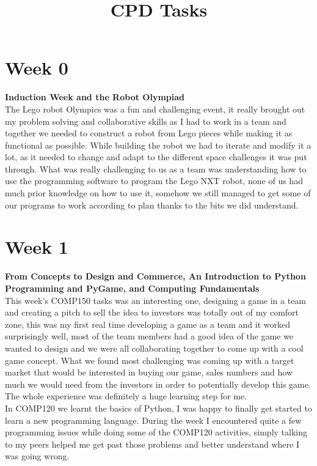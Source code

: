 \documentclass[11pt]{article}
\begin{document}
\title{CPD Tasks}
{\section*{Week 0}
{\small\textbf{Induction Week and the Robot Olympiad}}\\
The Lego robot Olympics was a fun and challenging event, it really brought out my problem solving and collaborative skills as I had to work in a team and together we needed to  construct a robot from Lego pieces while making it as functional as possible. While building the robot we had to iterate and modify it a lot, as it needed to change and adapt to the different space challenges it was put through. What was really challenging to us as a team was understanding how to use the programming software to program the Lego NXT robot, none of us had much prior knowledge on how to use it, somehow we still managed to get some of our programs to work according to plan thanks to the bits we did understand.
 
}
{\section*{Week 1}
{\small \textbf{From Concepts to Design and Commerce, An Introduction to Python Programming and PyGame, and Computing Fundamentals}}\\
This week's COMP150 tasks was an interesting one, designing a game in a team and creating a pitch to sell the idea to investors was totally out of my comfort zone, this was my first real time developing a game as a team and it worked surprisingly well, most of the team members had a good idea of the game we wanted to design and we were all collaborating together to come up with a cool game concept. What we found most challenging was coming up with a target market that would be interested in buying our game, sales numbers and how much we would need from the investors in order to potentially develop this game. The whole experience was definitely a huge learning step for me.\\
In COMP120 we learnt the basics of Python, I was happy to finally get started to learn a new programming language. During the week I encountered quite a few programming issues while doing some of the COMP120 activities, simply talking to my peers helped me get past those problems and better understand where I was going wrong.
}
\\~\\
\\
\end{document}
